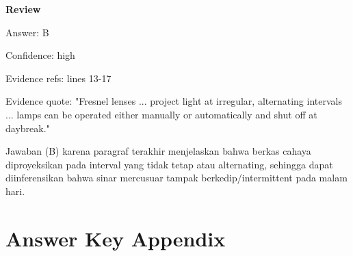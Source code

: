 \documentclass[12pt]{article}
\begin{document}
\par
\begingroup
\setlength{\parskip}{0pt}
\setlength{\parindent}{0pt}
\textbf{Review}\par
Answer: B\par
Confidence: high\par
Evidence refs: lines 13-17\par
Evidence quote: "Fresnel lenses ... project light at irregular, alternating intervals ... lamps can be operated either manually or automatically and shut off at daybreak."\par
Jawaban (B) karena paragraf terakhir menjelaskan bahwa berkas cahaya diproyeksikan pada interval yang tidak tetap atau alternating, sehingga dapat diinferensikan bahwa sinar mercusuar tampak berkedip/intermittent pada malam hari.\par
\endgroup
\par
\vspace{0.25\baselineskip}
\newpage
\section*{Answer Key Appendix}
\end{document}
